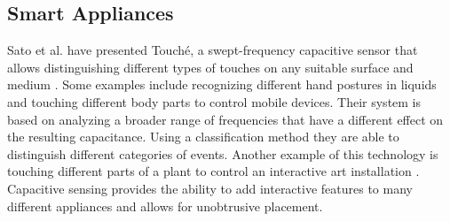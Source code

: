 \subsection{Smart Appliances}
Sato et al. have presented Touché, a swept-frequency capacitive sensor that allows distinguishing different types of touches on any suitable surface and medium \cite{Sato2012}. Some examples include recognizing different hand postures in liquids and touching different body parts to control mobile devices. Their system is based on analyzing a broader range of frequencies that have a different effect on the resulting capacitance. Using a classification method they are able to distinguish different categories of events. Another example of this technology is touching different parts of a plant to control an interactive art installation  \cite{poupyrev2012botanicus}. Capacitive sensing provides the ability to add interactive features to many different appliances and allows for unobtrusive placement.
